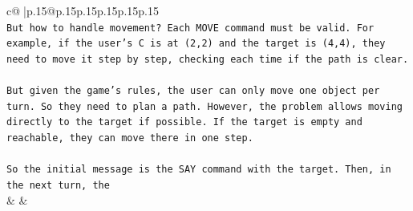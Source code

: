 \documentclass{article}
\begin{document}
{\begin{supertabular}{c@{$\;$}|p{.15\linewidth}@{}p{.15\linewidth}p{.15\linewidth}p{.15\linewidth}p{.15\linewidth}p{.15\linewidth}}
{{{\\ 
\texttt{But how to handle movement? Each MOVE command must be valid. For example, if the user's C is at (2,2) and the target is (4,4), they need to move it step by step, checking each time if the path is clear.} \\
\\ 
\texttt{But given the game's rules, the user can only move one object per turn. So they need to plan a path. However, the problem allows moving directly to the target if possible. If the target is empty and reachable, they can move there in one step.} \\
\\ 
\texttt{So the initial message is the SAY command with the target. Then, in the next turn, the} \\
            }
        }
    }
    & & \\ \\


\end{supertabular}}
\end{document}
